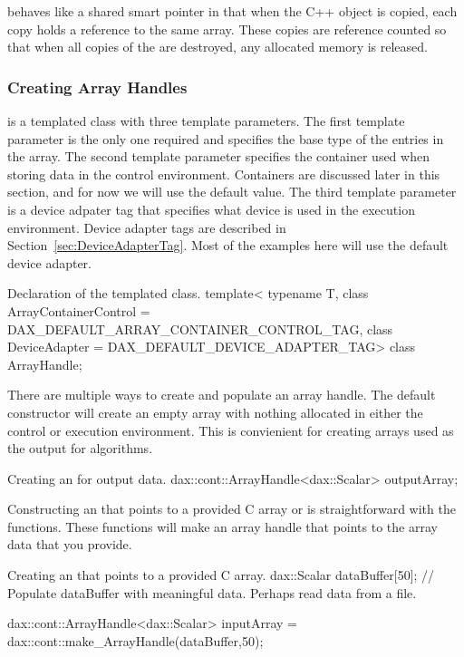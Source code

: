  behaves like a shared smart pointer in that when the
C++ object is copied, each copy holds a reference to the same array. These
copies are reference counted so that when all copies of the
 are destroyed, any allocated memory is released.

\subsubsection{Creating Array Handles}

 is a templated class with three template
parameters. The first template parameter is the only one required and
specifies the base type of the entries in the array. The second template
parameter specifies the container used when storing data in the control
environment. Containers are discussed later in this section, and for now we
will use the default value. The third template parameter is a device
adpater tag that specifies what device is used in the execution
environment. Device adapter tags are described in
Section~\ref{sec:DeviceAdapterTag}. Most of the examples here will use the
default device adapter.

\begin{daxexample}{Declaration of the \protect{} templated class.}
template<
    typename T,
    class ArrayContainerControl = DAX_DEFAULT_ARRAY_CONTAINER_CONTROL_TAG,
    class DeviceAdapter = DAX_DEFAULT_DEVICE_ADAPTER_TAG>
class ArrayHandle;
\end{daxexample}

There are multiple ways to create and populate an array handle. The default
 constructor will create an empty array with nothing
allocated in either the control or execution environment. This is
convienient for creating arrays used as the output for algorithms.

\begin{daxexample}{Creating an  for output data.}
dax::cont::ArrayHandle<dax::Scalar> outputArray;
\end{daxexample}

Constructing an  that points to a provided C array or
 is straightforward with the
 functions. These functions will make an array
handle that points to the array data that you provide.

\begin{daxexample}{Creating an  that points to a provided C array.}
dax::Scalar dataBuffer[50];
// Populate dataBuffer with meaningful data. Perhaps read data from a file.

dax::cont::ArrayHandle<dax::Scalar> inputArray = dax::cont::make_ArrayHandle(dataBuffer,50);
\end{daxexample}

